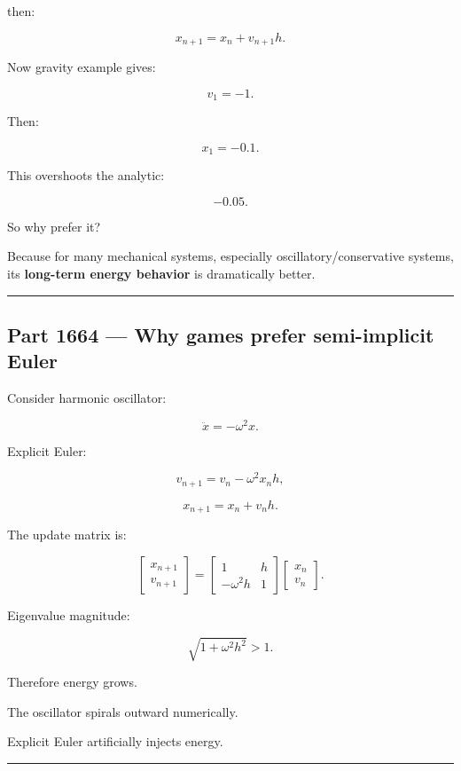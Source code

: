 then:

\[
\boxed{
x_{n+1}
=
x_n+v_{n+1}h.
}
\]

Now gravity example gives:

\[
v_1=-1.
\]

Then:

\[
x_1=-0.1.
\]

This overshoots the analytic:

\[
-0.05.
\]

So why prefer it?

Because for many mechanical systems, especially oscillatory/conservative systems, its \textbf{long-term energy behavior} is dramatically better.

\begin{center}\rule{0.5\linewidth}{0.5pt}\end{center}

\subsection{Part 1664 --- Why games prefer semi-implicit Euler}\label{06-engine-ii-ch037-part-1664-why-games-prefer-semi-implicit-euler}

Consider harmonic oscillator:

\[
\ddot x
=
-\omega^2x.
\]

Explicit Euler:

\[
v_{n+1}
=
v_n-\omega^2x_nh,
\]

\[
x_{n+1}
=
x_n+v_nh.
\]

The update matrix is:

\[
\begin{bmatrix}
x_{n+1}\\v_{n+1}
\end{bmatrix}
=
\begin{bmatrix}
1&h\\
-\omega^2h&1
\end{bmatrix}
\begin{bmatrix}
x_n\\v_n
\end{bmatrix}.
\]

Eigenvalue magnitude:

\[
\sqrt{1+\omega^2h^2}>1.
\]

Therefore energy grows.

The oscillator spirals outward numerically.

Explicit Euler artificially injects energy.

\begin{center}\rule{0.5\linewidth}{0.5pt}\end{center}

